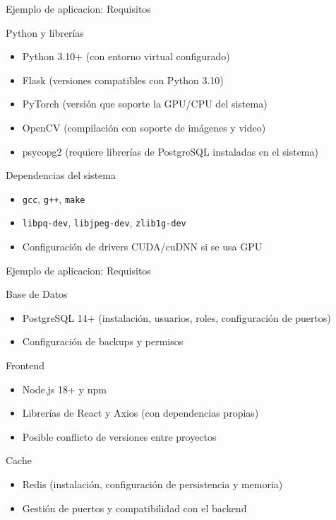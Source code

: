 \begin{frame}{Ejemplo de aplicacion: Requisitos}
    \begin{block}{Python y librerías}
        \begin{itemize}
            \item Python 3.10+ (con entorno virtual configurado)
            \item Flask (versiones compatibles con Python 3.10)
            \item PyTorch (versión que soporte la GPU/CPU del sistema)
            \item OpenCV (compilación con soporte de imágenes y video)
            \item psycopg2 (requiere librerías de PostgreSQL instaladas en el sistema)
        \end{itemize}
    \end{block}

    \begin{block}{Dependencias del sistema}
        \begin{itemize}
            \item \texttt{gcc}, \texttt{g++}, \texttt{make}
            \item \texttt{libpq-dev}, \texttt{libjpeg-dev}, \texttt{zlib1g-dev}
            \item Configuración de drivers CUDA/cuDNN si se usa GPU
        \end{itemize}
    \end{block}
\end{frame}

\begin{frame}{Ejemplo de aplicacion: Requisitos}
    \begin{block}{Base de Datos}
        \begin{itemize}
            \item PostgreSQL 14+ (instalación, usuarios, roles, configuración de puertos)
            \item Configuración de backups y permisos
        \end{itemize}
    \end{block}

    \begin{block}{Frontend}
        \begin{itemize}
            \item Node.js 18+ y npm
            \item Librerías de React y Axios (con dependencias propias)
            \item Posible conflicto de versiones entre proyectos
        \end{itemize}
    \end{block}

    \begin{block}{Cache}
        \begin{itemize}
            \item Redis (instalación, configuración de persistencia y memoria)
            \item Gestión de puertos y compatibilidad con el backend
        \end{itemize}
    \end{block}
\end{frame}


